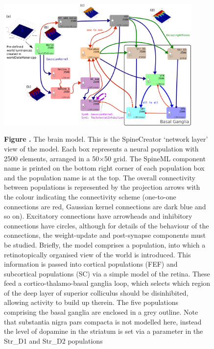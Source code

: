 \documentclass{frontiersSCNS}
\begin{document}
\begin{figure}[htb!]
\begin{center}
\includegraphics[width=0.9\textwidth]{./figures/Brain_Model.png}
\end{center}
\textbf{\label{brain_model} Figure .}
{ The brain model. This is the SpineCreator `network layer' view of
the model. Each box represents a neural population with 2500 elements,
arranged in a 50$\times$50 grid. The SpineML component name is printed
on the bottom right corner of each population box and the population
name is at the top. The overall connectivity between populations is
represented by the projection arrows with the colour indicating the
connectivity scheme (one-to-one connections are red, Gaussian kernel
connections are dark blue and so on). Excitatory connections have
arrowheads and inhibitory connections have circles, although for
details of the behaviour of the connections, the weight-update and
post-synapse components must be studied. Briefly, the model comprises
a  population, into which a retinotopically organised view of
the world is introduced. This information is passed into cortical
populations (FEF) and subcortical populations (SC) via a simple model
of the retina. These feed a cortico-thalamo-basal ganglia loop, which
selects which region of the deep layer of superior colliculus should
be disinhibited, allowing activity to build up therein. The five
populations comprising the basal ganglia are enclosed in a grey
outline. Note that substantia nigra pars compacta is not modelled
here, instead the level of dopamine in the striatum is set via a
parameter in the Str\_D1 and Str\_D2 populations}
\end{figure}
\end{document}
